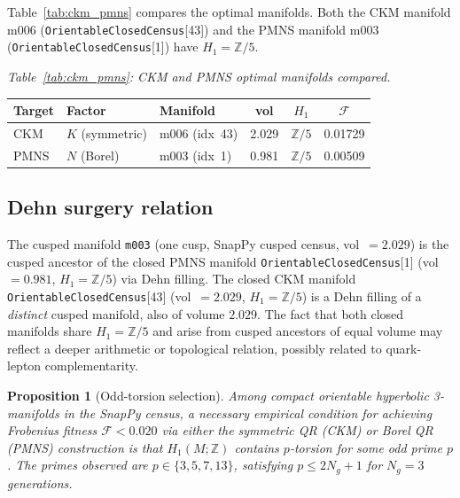 \documentclass[11pt,a4paper]{article}
\newtheorem{proposition}{Proposition}
\begin{document}
Table~\ref{tab:ckm_pmns} compares the optimal manifolds.
Both the CKM manifold m006 (\texttt{OrientableClosedCensus}[43])
and the PMNS manifold m003 (\texttt{OrientableClosedCensus}[1])
have $H_1 = \mathbb{Z}/5$.


\begin{center}
\textit{Table~\ref{tab:ckm_pmns}: CKM and PMNS optimal manifolds compared.}\label{tab:ckm_pmns}\\
\smallskip
\begin{tabular}{lllccc}
\toprule
Target & Factor & Manifold & vol & $H_1$ & $\mathcal{F}$ \\
\midrule
CKM  & $K$ (symmetric) & m006 (idx~43) & 2.029 & $\mathbb{Z}/5$ & 0.01729 \\
PMNS & $N$ (Borel)     & m003 (idx~1)  & 0.981 & $\mathbb{Z}/5$ & 0.00509 \\
\bottomrule
\end{tabular}
\end{center}


\subsection{Dehn surgery relation}

The cusped manifold \texttt{m003} (one cusp, SnapPy cusped census,
vol~$= 2.029$) is the cusped ancestor of the closed PMNS manifold
\texttt{OrientableClosedCensus}[1] (vol~$= 0.981$, $H_1 = \mathbb{Z}/5$)
via Dehn filling.
The closed CKM manifold \texttt{OrientableClosedCensus}[43]
(vol~$= 2.029$, $H_1 = \mathbb{Z}/5$) is a Dehn filling of a
\emph{distinct} cusped manifold, also of volume $2.029$.
The fact that both closed manifolds share $H_1 = \mathbb{Z}/5$ and
arise from cusped ancestors of equal volume may reflect a deeper
arithmetic or topological relation, possibly related to
quark-lepton complementarity.

\begin{proposition}[Odd-torsion selection]
\label{prop:oddtorsion}
Among compact orientable hyperbolic 3-manifolds in the SnapPy census,
a necessary empirical condition for achieving Frobenius fitness
$\mathcal{F} < 0.020$ via either the symmetric QR \emph{(CKM)} or
Borel QR \emph{(PMNS)} construction is that $H_1(M;\mathbb{Z})$
contains $p$-torsion for some odd prime $p$.
The primes observed are $p \in \{3, 5, 7, 13\}$, satisfying
$p \leq 2N_g + 1$ for $N_g = 3$ generations.
\end{proposition}

\end{document}
